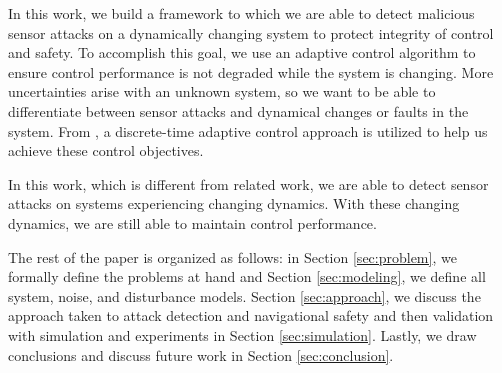 
In this work, we build a framework to which we are able to detect malicious sensor attacks on a dynamically changing system to protect integrity of control and safety. To accomplish this goal, we use an adaptive control algorithm to ensure control performance is not degraded while the system is changing. More uncertainties arise with an unknown system, so we want to be able to differentiate between sensor attacks and dynamical changes or faults in the system. From \cite{tao2003adaptive,Goodwin:2009:AFP:1643720}, a  discrete-time adaptive control approach is utilized to help us achieve these control objectives.

In this work, which is different from related work, we are able to detect sensor attacks on systems experiencing changing dynamics. With these changing dynamics, we are still able to maintain control performance.

The rest of the paper is organized as follows: in Section \ref{sec:problem}, we formally define the problems at hand and Section \ref{sec:modeling}, we define all system, noise, and disturbance models. Section \ref{sec:approach}, we discuss the approach taken to attack detection and navigational safety and then validation with simulation and experiments in Section \ref{sec:simulation}. Lastly, we draw conclusions and discuss future work in Section \ref{sec:conclusion}.

